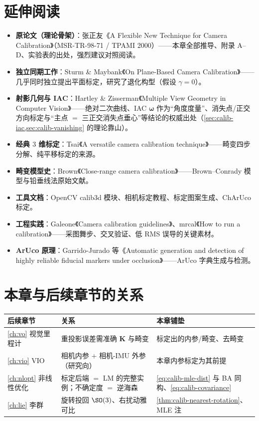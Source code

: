 \section*{延伸阅读}
\begin{itemize}
  \item \textbf{原论文（理论骨架）}：张正友《A Flexible New Technique for Camera Calibration》\cite{zhang2000calibration}（MSR-TR-98-71 / TPAMI 2000）——本章全部推导、附录 A--D、实验表的出处，强烈建议对照阅读。
  \item \textbf{独立同期工作}：Sturm \& Maybank《On Plane-Based Camera Calibration》\cite{sturm1999plane}——几乎同时独立提出平面标定，研究了退化构型（假设 $\gamma=0$）。
  \item \textbf{射影几何与 IAC}：Hartley \& Zisserman《Multiple View Geometry in Computer Vision》\cite{hartley2004multiview}——绝对二次曲线、IAC $\boldsymbol{\omega}$ 作为“角度度量”、消失点/正交方向标定与“主点 $=$ 三正交消失点垂心”等结论的权威出处（\cref{sec:calib-iac,sec:calib-vanishing} 的理论靠山）。
  \item \textbf{经典 $3$ 维标定}：Tsai《A versatile camera calibration technique》\cite{tsai1987versatile}——畸变四步分解、纯平移标定的来源。
  \item \textbf{畸变模型史}：Brown《Close-range camera calibration》\cite{brown1971closerange}——Brown--Conrady 模型与铅垂线法原始文献。
  \item \textbf{工具文档}：OpenCV calib3d 模块\cite{opencv2024calib}、相机标定教程\cite{opencv2013calib}、标定图案生成\cite{opencv2024pattern}、ChArUco 标定\cite{opencv2024charuco}。
  \item \textbf{工程实践}：Galeone《Camera calibration guidelines》\cite{galeone2018guidelines}、mrcal《How to run a calibration》\cite{kogan2024mrcal}——采图舞步、交叉验证、低 RMS 误导的关键素材。
  \item \textbf{ArUco 原理}：Garrido-Jurado 等《Automatic generation and detection of highly reliable fiducial markers under occlusion》\cite{garrido2014aruco}——ArUco 字典生成与检测。
\end{itemize}

\section*{本章与后续章节的关系}
\begin{table}[ht]\centering\small
\begin{tabular}{lll}
\toprule
后续章节 & 关系 & 本章铺垫 \\
\midrule
\cref{ch:vo} 视觉里程计 & 重投影误差需准确 $\mathbf{K}$ 与畸变 & 标定出的内参/畸变、去畸变 \\
\cref{ch:vio} VIO & 相机内参 $+$ 相机-IMU 外参（研究向）& 本章内参标定为其前提 \\
\cref{ch:nlopt} 非线性优化 & 标定后端 $=$ LM 的完整实例；不确定度 $=$ 逆海森 & \cref{eq:calib-mle-dist} 与 BA 同构、\cref{eq:calib-covariance} \\
\cref{ch:lie} 李群 & 旋转投回 $\SO(3)$、右扰动雅可比 & \cref{thm:calib-nearest-rotation}、MLE 注 \\
\bottomrule
\end{tabular}
\end{table}


